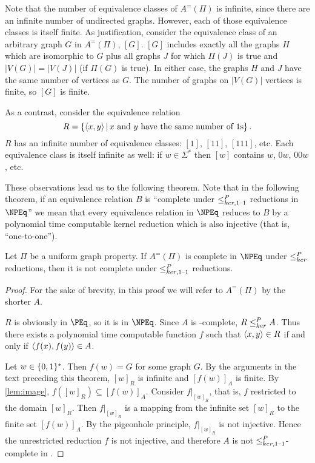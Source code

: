 Note that the number of equivalence classes of $A^=(\Pi)$ is infinite, since there are an infinite number of undirected graphs.
However, each of those equivalence classes is itself finite.
As justification, consider the equivalence class of an arbitrary graph $G$ in $A^=(\Pi)$, $[G]$.
$[G]$ includes exactly all the graphs $H$ which are isomorphic to $G$ plus all graphs $J$ for which $\Pi(J)$ is true and $|V(G)|=|V(J)|$ (if $\Pi(G)$ is true).
In either case, the graphs $H$ and $J$ have the same number of vertices as $G$.
The number of graphs on $|V(G)|$ vertices is finite, so $[G]$ is finite.

As a contrast, consider the equivalence relation
\begin{displaymath}
  R=\left\{\langle x,y\rangle \,\middle|\, x\text{ and }y\text{ have the same number of }1\textnormal{s}\right\}.
\end{displaymath}
$R$ has an infinite number of equivalence classes: $[1]$, $[11]$, $[111]$, etc.
Each equivalence class is itself infinite as well: if $w\in\Sigma^*$ then $[w]$ contains $w$, $0w$, $00w$, etc.

These observations lead us to the following theorem.
Note that in the following theorem, if an equivalence relation $B$ is ``complete under $\leq^{P}_{ker,1\text{--}1}$ reductions in $\NPEq$'' we mean that every equivalence relation in $\NPEq$ reduces to $B$ by a polynomial time computable kernel reduction which is also injective (that is, ``one-to-one'').

\begin{theorem}
  Let $\Pi$ be a uniform graph property.
  If $A^=(\Pi)$ is complete in $\NPEq$ under $\leq^{P}_{ker}$ reductions, then it is not complete under $\leq^{P}_{ker,1\text{--}1}$ reductions.
\end{theorem}
\begin{proof}
  For the sake of brevity, in this proof we will refer to $A^=(\Pi)$ by the shorter $A$.

  $R$ is obviously in $\PEq$, so it is in $\NPEq$.
  Since $A$ is \NPEq-complete, $R\leq^{P}_{ker} A$.
  Thus there exists a polynomial time computable function $f$ such that $\langle x,y\rangle\in R$ if and only if $\langle f(x),f(y)\rangle\in A$.

  Let $w\in\{0, 1\}^{*}$.
  Then $f(w)=G$ for some graph $G$.
  By the arguments in the text preceding this theorem, $[w]_R$ is infinite and $[f(w)]_A$ is finite.
  By \autoref{lem:image}, $f([w]_R)\subseteq [f(w)]_A$.
  Consider $f|_{[w]_R}$, that is, $f$ restricted to the domain $[w]_R$.
  Then $f|_{[w]_R}$ is a mapping from the infinite set $[w]_R$ to the finite set $[f(w)]_A$.
  By the pigeonhole principle, $f|_{[w]_R}$ is not injective.
  Hence the unrestricted reduction $f$ is not injective, and therefore $A$ is not $\leq^{P}_{ker,1\text{--}1}$-complete in \NPEq.
\end{proof}
